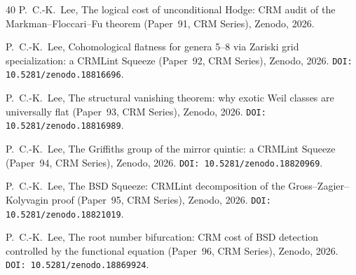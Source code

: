\documentclass[11pt]{article}
\theoremstyle{plain}
\theoremstyle{definition}
\theoremstyle{remark}
\begin{document}
\begin{thebibliography}{40}
P.~C.-K.\ Lee,
The logical cost of unconditional Hodge: CRM audit of the
Markman--Floccari--Fu theorem
(Paper~91, CRM Series),
Zenodo, 2026.

P.~C.-K.\ Lee,
Cohomological flatness for genera 5--8 via Zariski grid specialization:
a CRMLint Squeeze (Paper~92, CRM Series),
Zenodo, 2026. \texttt{DOI: 10.5281/zenodo.18816696}.

P.~C.-K.\ Lee,
The structural vanishing theorem: why exotic Weil classes are
universally flat
(Paper~93, CRM Series),
Zenodo, 2026. \texttt{DOI: 10.5281/zenodo.18816989}.

P.~C.-K.\ Lee,
The Griffiths group of the mirror quintic: a CRMLint Squeeze
(Paper~94, CRM Series),
Zenodo, 2026. \texttt{DOI: 10.5281/zenodo.18820969}.

P.~C.-K.\ Lee,
The BSD Squeeze: CRMLint decomposition of the
Gross--Zagier--Kolyvagin proof
(Paper~95, CRM Series),
Zenodo, 2026. \texttt{DOI: 10.5281/zenodo.18821019}.

P.~C.-K.\ Lee,
The root number bifurcation: CRM cost of BSD detection controlled
by the functional equation
(Paper~96, CRM Series),
Zenodo, 2026. \texttt{DOI: 10.5281/zenodo.18869924}.

\end{thebibliography}
\end{document}
